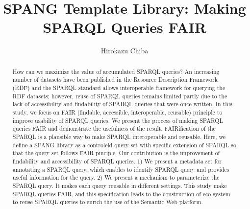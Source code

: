 \documentclass[runningheads]{llncs}
\begin{document}
\title{SPANG Template Library: Making SPARQL Queries FAIR}
\author{Hirokazu Chiba}
%
\maketitle              %
%
\begin{abstract}
How can we maximize the value of accumulated SPARQL queries? 
An increasing number of datasets have been published in the Resource Description Framework (RDF) and the SPARQL standard allows interoperable framework for querying the RDF datasets; however, reuse of SPARQL queries remains limited partly due to the lack of accessibility and findability of SPARQL queries that were once written. 
In this study, we focus on FAIR (findable, accessible, interoperable,
reusable) principle to improve usability of SPARQL queries.
We present the process of making SPARQL queries FAIR and demonstrate the usefulness of the result.
FAIRification of the SPARQL is a plausible way to make SPARQL interoperable and reusable.
Here, we define a SPANG library as a controleld query set with specific
extension of SPARQL so that the query set follows FAIR pinciple.
Our contribution is the improvement of findability and accessibility of SPARQL queries.
1) We present a metadata set for annotating a SPARQL query, which
enables to identify SPARQL query and provides useful information for the query.
2) We present a mechanism to parameterize the SPARQL query.
It makes each query reusable in different settings.
This study make SPARQL queries FAIR, and this specification leads to the construction of eco-system to reuse SPARQL queries to enrich the use of the Semantic Web platform.


\end{abstract}
\end{document}

